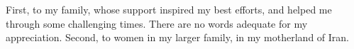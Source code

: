 First, to my family, whose support inspired my best efforts, and helped me through some challenging times. There are no words adequate for my appreciation. Second, to women in my larger family, in my motherland of Iran. 
